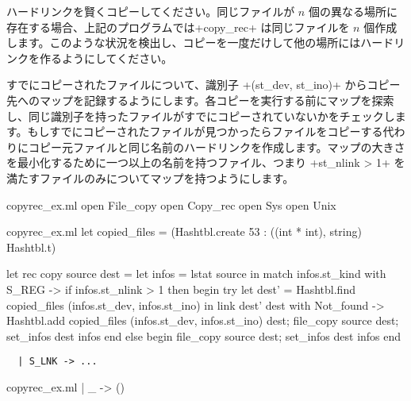 \begin{exercise}
\label{ex/copyrec}
ハードリンクを賢くコピーしてください。同じファイルが $n$ 個の異なる場所に存在する場合、上記のプログラムでは\ml+copy_rec+ は同じファイルを $n$ 個作成します。このような状況を検出し、コピーを一度だけして他の場所にはハードリンクを作るようにしてください。
\end{exercise}

\begin{answer}
すでにコピーされたファイルについて、識別子 \ml+(st_dev, st_ino)+ からコピー先へのマップを記録するようにします。各コピーを実行する前にマップを探索し、同じ識別子を持ったファイルがすでにコピーされていないかをチェックします。もしすでにコピーされたファイルが見つかったらファイルをコピーする代わりにコピー元ファイルと同じ名前のハードリンクを作成します。マップの大きさを最小化するために一つ以上の名前を持つファイル、つまり \ml+st_nlink > 1+ を満たすファイルのみについてマップを持つようにします。
%
\begin{codefile}{copyrec_ex.ml}
open File_copy
open Copy_rec
open Sys
open Unix
\end{codefile}
%
\begin{listingcodefile}{copyrec_ex.ml}
let copied_files = (Hashtbl.create 53 : ((int * int), string) Hashtbl.t)

let rec copy source dest =
  let infos = lstat source in
  match infos.st_kind with
    S_REG ->
      if infos.st_nlink > 1 then begin
        try
          let dest' =
            Hashtbl.find copied_files (infos.st_dev, infos.st_ino)
          in link dest' dest
        with Not_found ->
          Hashtbl.add copied_files (infos.st_dev, infos.st_ino) dest;
          file_copy source dest;
          set_infos dest infos
      end else begin
        file_copy source dest;
        set_infos dest infos
      end
\end{listingcodefile}
\begin{lstlisting}
  | S_LNK -> ...
\end{lstlisting}
\begin{codefile}{copyrec_ex.ml}
| _ -> ()
\end{codefile}
\end{answer}

